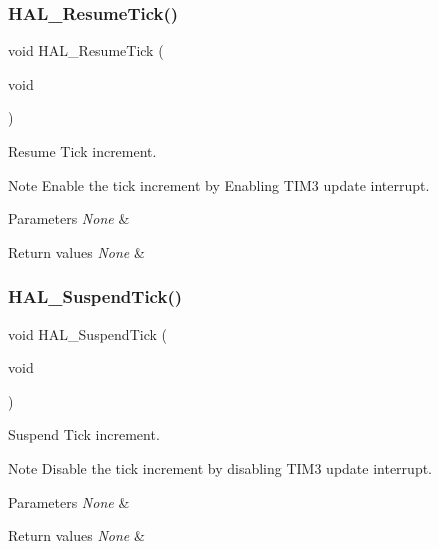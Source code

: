 \subsubsection{\texorpdfstring{H\+A\+L\+\_\+\+Resume\+Tick()}{HAL\_ResumeTick()}}
{\footnotesize\ttfamily void H\+A\+L\+\_\+\+Resume\+Tick (\begin{DoxyParamCaption}\item[{void}]{ }\end{DoxyParamCaption})}



Resume Tick increment. 

\begin{DoxyNote}{Note}
Enable the tick increment by Enabling T\+I\+M3 update interrupt. 
\end{DoxyNote}

\begin{DoxyParams}{Parameters}
{\em None} & \\
\hline
\end{DoxyParams}

\begin{DoxyRetVals}{Return values}
{\em None} & \\
\hline
\end{DoxyRetVals}
\hypertarget{group___h_a_l___time_base_gaaf651af2afe688a991c657f64f8fa5f9}{}\label{group___h_a_l___time_base_gaaf651af2afe688a991c657f64f8fa5f9} 
\subsubsection{\texorpdfstring{H\+A\+L\+\_\+\+Suspend\+Tick()}{HAL\_SuspendTick()}}
{\footnotesize\ttfamily void H\+A\+L\+\_\+\+Suspend\+Tick (\begin{DoxyParamCaption}\item[{void}]{ }\end{DoxyParamCaption})}



Suspend Tick increment. 

\begin{DoxyNote}{Note}
Disable the tick increment by disabling T\+I\+M3 update interrupt. 
\end{DoxyNote}

\begin{DoxyParams}{Parameters}
{\em None} & \\
\hline
\end{DoxyParams}

\begin{DoxyRetVals}{Return values}
{\em None} & \\
\hline
\end{DoxyRetVals}
